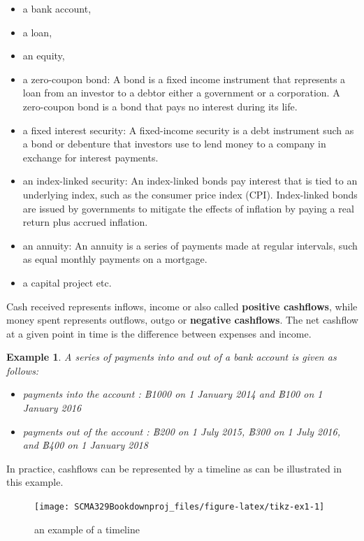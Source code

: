 \documentclass[
]{book}
\theoremstyle{definition}
\theoremstyle{definition}
\newtheorem{example}{Example}[chapter]
\theoremstyle{definition}
\theoremstyle{definition}
\theoremstyle{remark}
\begin{document}
\begin{itemize}
\item
  a bank account,
\item
  a loan,
\item
  an equity,
\item
  a zero-coupon bond: A bond is a fixed income instrument that
  represents a loan from an investor to a debtor either a government
  or a corporation. A zero-coupon bond is a bond that pays no interest
  during its life.
\item
  a fixed interest security: A fixed-income security is a debt
  instrument such as a bond or debenture that investors use to lend
  money to a company in exchange for interest payments.
\item
  an index-linked security: An index-linked bonds pay interest that is
  tied to an underlying index, such as the consumer price index (CPI).
  Index-linked bonds are issued by governments to mitigate the effects
  of inflation by paying a real return plus accrued inflation.
\item
  an annuity: An annuity is a series of payments made at regular
  intervals, such as equal monthly payments on a mortgage.
\item
  a capital project etc.
\end{itemize}

Cash received represents inflows, income or also called \textbf{positive
cashflows}, while money spent represents outflows, outgo or \textbf{negative
cashflows}. The net cashflow at a given point in time is the difference
between expenses and income.

\begin{example}

\emph{A series of payments into and out of a bank account is given as
follows:}

\begin{itemize}
\item
  \emph{payments into the account : ฿1000 on 1 January 2014 and ฿100 on 1
  January 2016}
\item
  \emph{payments out of the account : ฿200 on 1 July 2015, ฿300 on 1 July
  2016, and ฿400 on 1 January 2018}
\end{itemize}

\end{example}

In practice, cashflows can be represented by a timeline as can be
illustrated in this example.

\begin{figure}

{\centering \texttt{[image: SCMA329Bookdownproj\_files/figure-latex/tikz-ex1-1]} 

}

\caption{an example of a timeline}\label{fig:tikz-ex1}
\end{figure}
\end{document}
